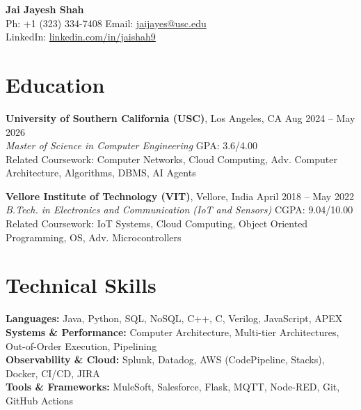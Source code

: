\documentclass[letterpaper,10pt]{article}
\begin{document}
\begin{center}
    {\LARGE \textbf{Jai Jayesh Shah}} \\
    \vspace{5pt}
    \small
    Ph: +1 (323) 334-7408 \quad Email: \href{mailto:jaijayes@usc.edu}{jaijayes@usc.edu} \\
    LinkedIn: \href{https://www.linkedin.com/in/jaishah9}{linkedin.com/in/jaishah9} \\
    \vspace{-8pt}
\end{center}

\section*{Education}
\textbf{University of Southern California (USC)}, Los Angeles, CA \hfill Aug 2024 -- May 2026 \\
\textit{Master of Science in Computer Engineering} \hfill GPA: 3.6/4.00 \\
Related Coursework: Computer Networks, Cloud Computing, Adv. Computer Architecture, Algorithms, DBMS, AI Agents

\vspace{2pt}

\textbf{Vellore Institute of Technology (VIT)}, Vellore, India \hfill April 2018 -- May 2022 \\
\textit{B.Tech. in Electronics and Communication (IoT and Sensors)} \hfill CGPA: 9.04/10.00 \\
Related Coursework: IoT Systems, Cloud Computing, Object Oriented Programming, OS, Adv. Microcontrollers

\section*{Technical Skills}
\textbf{Languages:} Java, Python, SQL, NoSQL, C++, C, Verilog, JavaScript, APEX \\
\textbf{Systems \& Performance:} Computer Architecture, Multi-tier Architectures, Out-of-Order Execution, Pipelining \\
\textbf{Observability \& Cloud:} Splunk, Datadog, AWS (CodePipeline, Stacks), Docker, CI/CD, JIRA \\
\textbf{Tools \& Frameworks:} MuleSoft, Salesforce, Flask, MQTT, Node-RED, Git, GitHub Actions

\end{document}
